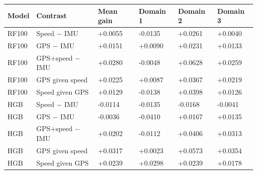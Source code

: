 \par\medskip
\par\medskip
\begin{singlespace}\small
\noindent\begin{minipage}{\linewidth}
\centering
{}
\begin{tabularx}{\linewidth}{XYYYYY}
\toprule
Model & Contrast & Mean gain & Domain 1 & Domain 2 & Domain 3 \\
\midrule
RF100 & Speed − IMU & +0.0055 & -0.0135 & +0.0261 & +0.0040 \\
RF100 & GPS − IMU & +0.0151 & +0.0090 & +0.0231 & +0.0133 \\
RF100 & GPS+speed − IMU & +0.0280 & -0.0048 & +0.0628 & +0.0259 \\
RF100 & GPS given speed & +0.0225 & +0.0087 & +0.0367 & +0.0219 \\
RF100 & Speed given GPS & +0.0129 & -0.0138 & +0.0398 & +0.0126 \\
HGB & Speed − IMU & -0.0114 & -0.0135 & -0.0168 & -0.0041 \\
HGB & GPS − IMU & -0.0036 & -0.0410 & +0.0167 & +0.0135 \\
HGB & GPS+speed − IMU & +0.0202 & -0.0112 & +0.0406 & +0.0313 \\
HGB & GPS given speed & +0.0317 & +0.0023 & +0.0573 & +0.0354 \\
HGB & Speed given GPS & +0.0239 & +0.0298 & +0.0239 & +0.0178 \\
\bottomrule
\end{tabularx}
\end{minipage}
\end{singlespace}
\par\medskip
\par\medskip
